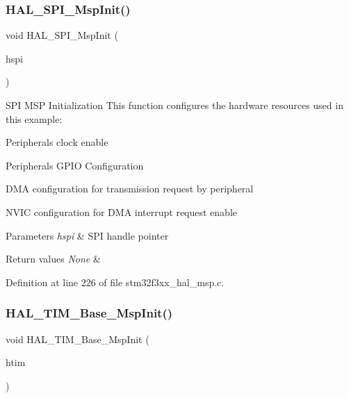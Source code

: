 \subsubsection{H\+A\+L\+\_\+\+S\+P\+I\+\_\+\+Msp\+Init()}
{\footnotesize\ttfamily void H\+A\+L\+\_\+\+S\+P\+I\+\_\+\+Msp\+Init (\begin{DoxyParamCaption}\item[{S\+P\+I\+\_\+\+Handle\+Type\+Def $\ast$}]{hspi }\end{DoxyParamCaption})}



S\+PI M\+SP Initialization This function configures the hardware resources used in this example\+: 


\begin{DoxyItemize}
\item Peripheral\textquotesingle{}s clock enable
\item Peripheral\textquotesingle{}s G\+P\+IO Configuration
\item D\+MA configuration for transmission request by peripheral
\item N\+V\+IC configuration for D\+MA interrupt request enable 
\begin{DoxyParams}{Parameters}
{\em hspi} & S\+PI handle pointer \\
\hline
\end{DoxyParams}

\begin{DoxyRetVals}{Return values}
{\em None} & \\
\hline
\end{DoxyRetVals}

\end{DoxyItemize}

Definition at line 226 of file stm32f3xx\+\_\+hal\+\_\+msp.\+c.

\mbox{\label{group___h_a_l___m_s_p___private___functions_ga818f4d5d1e2f417438d281b4ac9efb9c}} 
\subsubsection{H\+A\+L\+\_\+\+T\+I\+M\+\_\+\+Base\+\_\+\+Msp\+Init()}
{\footnotesize\ttfamily void H\+A\+L\+\_\+\+T\+I\+M\+\_\+\+Base\+\_\+\+Msp\+Init (\begin{DoxyParamCaption}\item[{T\+I\+M\+\_\+\+Handle\+Type\+Def $\ast$}]{htim }\end{DoxyParamCaption})}



